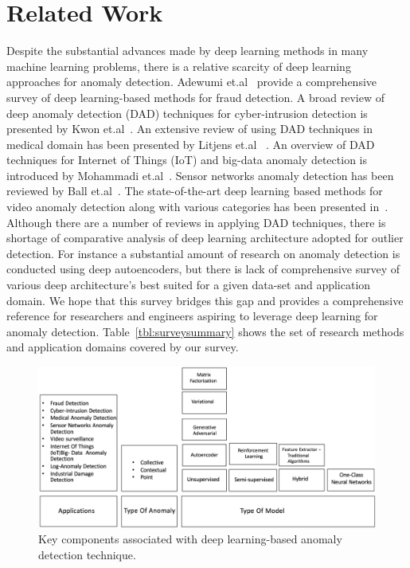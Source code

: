 \section{Related Work}
Despite the substantial advances made by deep learning methods in many machine learning problems, there
is a relative scarcity of deep learning approaches for anomaly detection. Adewumi et.al~\cite{adewumi2017survey} provide a comprehensive survey of deep learning-based methods for fraud detection. A broad review of deep anomaly detection (DAD) techniques for cyber-intrusion detection is presented by Kwon et.al~\cite{kwon2017survey}. An extensive review of using DAD techniques in medical domain has been presented by Litjens et.al ~\cite{litjens2017survey}. An  overview of DAD techniques for Internet of Things (IoT) and  big-data anomaly detection is introduced by  Mohammadi et.al~\cite{mohammadi2017deep}. Sensor networks anomaly detection has been reviewed  by  Ball et.al~\cite{ball2017comprehensive}. The state-of-the-art deep learning based methods for video anomaly detection along with various categories has been presented in~\cite{kiran2018overview}. Although there are a number of reviews in applying DAD techniques, there is shortage of comparative analysis of deep learning architecture adopted for outlier detection. For instance a substantial amount of research on anomaly detection is conducted using deep autoencoders, but there is lack of comprehensive survey of various deep architecture's best suited for a given data-set and application domain. We hope that this survey bridges this gap and provides a comprehensive reference for researchers and engineers aspiring to leverage deep learning for anomaly detection. Table~\ref{tbl:surveysummary} shows the set of research methods and application domains covered by our survey.


\begin{figure}[h]
\centering
\includegraphics[scale=0.45]{images/AnomalyDetectionTaxonomy}
\caption{Key components associated with deep learning-based anomaly detection technique.}
\label{fig:surveyTaxonomy}
\end{figure}

